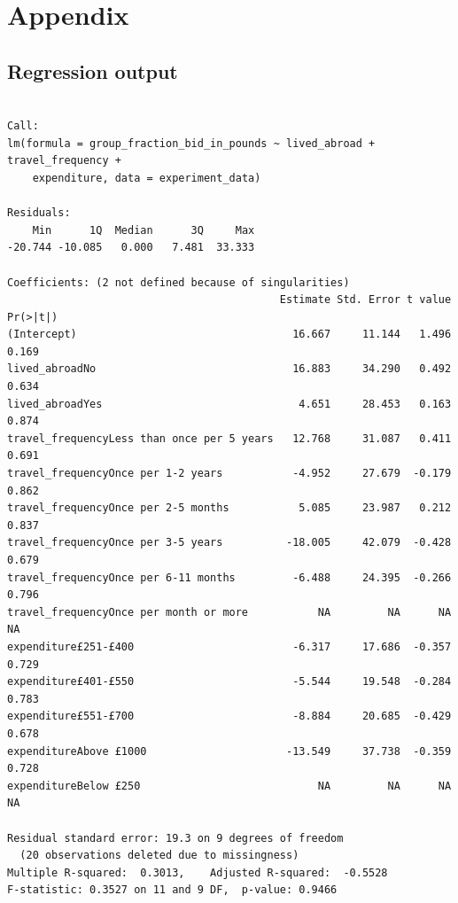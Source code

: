\documentclass[
]{report}
\begin{document}
\chapter{Appendix}\label{appendix}

\section{Regression output}\label{regression-output}

\begin{verbatim}

Call:
lm(formula = group_fraction_bid_in_pounds ~ lived_abroad + travel_frequency + 
    expenditure, data = experiment_data)

Residuals:
    Min      1Q  Median      3Q     Max 
-20.744 -10.085   0.000   7.481  33.333 

Coefficients: (2 not defined because of singularities)
                                           Estimate Std. Error t value Pr(>|t|)
(Intercept)                                  16.667     11.144   1.496    0.169
lived_abroadNo                               16.883     34.290   0.492    0.634
lived_abroadYes                               4.651     28.453   0.163    0.874
travel_frequencyLess than once per 5 years   12.768     31.087   0.411    0.691
travel_frequencyOnce per 1-2 years           -4.952     27.679  -0.179    0.862
travel_frequencyOnce per 2-5 months           5.085     23.987   0.212    0.837
travel_frequencyOnce per 3-5 years          -18.005     42.079  -0.428    0.679
travel_frequencyOnce per 6-11 months         -6.488     24.395  -0.266    0.796
travel_frequencyOnce per month or more           NA         NA      NA       NA
expenditure£251-£400                         -6.317     17.686  -0.357    0.729
expenditure£401-£550                         -5.544     19.548  -0.284    0.783
expenditure£551-£700                         -8.884     20.685  -0.429    0.678
expenditureAbove £1000                      -13.549     37.738  -0.359    0.728
expenditureBelow £250                            NA         NA      NA       NA

Residual standard error: 19.3 on 9 degrees of freedom
  (20 observations deleted due to missingness)
Multiple R-squared:  0.3013,    Adjusted R-squared:  -0.5528 
F-statistic: 0.3527 on 11 and 9 DF,  p-value: 0.9466
\end{verbatim}
\end{document}
